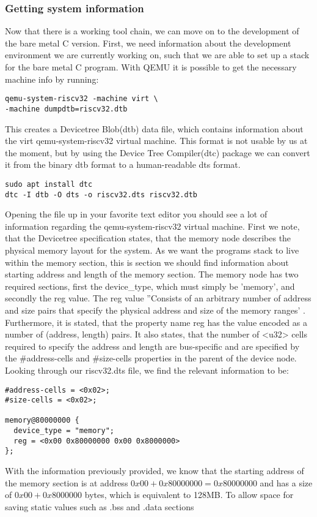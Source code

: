 \subsubsection{Getting system information}\label{sec:sys-info}
Now that there is a working tool chain, we can move on to the development of the
bare metal C version. First, we need information about the development
environment we are currently working on, such that we are able to set up a stack
for the bare metal C program. With QEMU it is possible to get the necessary
machine info by running:
\begin{lstlisting}
qemu-system-riscv32 -machine virt \
-machine dumpdtb=riscv32.dtb
\end{lstlisting}
This creates a Devicetree Blob(dtb) data file, which contains information about
the virt qemu-system-riscv32 virtual machine. This format is not usable by us at
the moment, but by using the Device Tree Compiler(dtc) package we can convert it
from the binary dtb format to a human-readable dts format.
\begin{lstlisting}
sudo apt install dtc
dtc -I dtb -O dts -o riscv32.dts riscv32.dtb
\end{lstlisting}
Opening the file up in your favorite text editor you should see a lot of
information regarding the qemu-system-riscv32 virtual machine. First we note,
that the Devicetree specification states, that the memory node describes the
physical memory layout for the system. As we want the programs stack to live
within the memory section, this is section we should find information about
starting address and length of the memory section. The memory node has two
required sections, first the device\_type, which must simply be 'memory', and
secondly the reg value. The reg value ''Consists of an arbitrary number of
address and size pairs that specify the physical address and size of the memory
ranges' \cite{DTS}. Furthermore, it is stated, that the property name reg has
the value encoded as a number of (address, length) pairs. It also states, that
the number of <u32> cells required to specify the address and length are
bus-specific and are specified by the \#address-cells and \#size-cells
properties in the parent of the device node. Looking through our riscv32.dts
file, we find the relevant information to be:
\begin{lstlisting}
#address-cells = <0x02>;
#size-cells = <0x02>;

memory@80000000 {
  device_type = "memory";
  reg = <0x00 0x80000000 0x00 0x8000000>
};
\end{lstlisting}
With the information previously provided, we know that the starting address of
the memory section is at address $0x00 + 0x80000000 = 0x80000000$ and has a size
of $0x00 + 0x8000000$ bytes, which is equivalent to 128MB. To allow space for
saving static values such as .bss and .data sections

